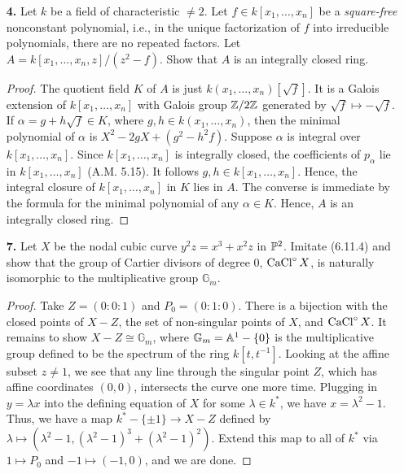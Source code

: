 \documentclass{article}
\begin{document}
\begin{enumerate} [label=\textbf{\arabic*.}, leftmargin=0em]
\item [\textbf{4.}] Let $k$ be a field of characteristic $\neq 2$. Let $f \in k[x_1, \dots, x_n]$ be a \textit{square-free} nonconstant polynomial, i.e., in the unique factorization of $f$ into irreducible polynomials, there are no repeated factors. Let $A = k[x_1, \dots, x_n, z] / (z^2 - f)$. Show that $A$ is an integrally closed ring.

\begin{proof}
    The quotient field $K$ of $A$ is just $k(x_1, \dots, x_n)[\sqrt{f}]$.
    It is a Galois extension of $k[x_1, \dots, x_n]$ with Galois group $\mathbb{Z} / 2 \mathbb{Z}$ generated by $\sqrt{f} \mapsto -\sqrt{f}$.
    If $\alpha = g + h \sqrt{f} \in K$, where $g, h \in k(x_1, \dots, x_n)$, then the minimal polynomial of $\alpha$ is $X^2 - 2g X + (g^2 - h^2f)$. Suppose $\alpha$ is integral over $k[x_1, \dots, x_n]$. Since $k[x_1, \dots, x_n]$ is integrally closed, the coefficients of $p_\alpha$ lie in $k[x_1, \dots, x_n]$ (A.M. 5.15). It follows $g, h \in k[x_1, \dots, x_n]$. Hence, the integral closure of $k[x_1, \dots, x_n]$ in $K$ lies in $A$. The converse is immediate by the formula for the minimal polynomial of any $\alpha \in K$. Hence, $A$ is an integrally closed ring.
\end{proof}

\item[\textbf{7.}] Let $X$ be the nodal cubic curve $y^2 z = x^3 + x^2 z$ in $\mathbb{P}^2$. Imitate (6.11.4) and show that the group of Cartier divisors of degree $0$, $\operatorname{CaCl}^\circ X$, is naturally isomorphic to the multiplicative group $\mathbb{G}_m$.

\begin{proof}
   Take $Z = (0:0:1)$ and $P_0 = (0:1:0)$.
   There is a bijection with the closed points of $X - Z$, the set of non-singular points of $X$, and $\operatorname{CaCl}^\circ X$.
   It remains to show $X - Z \cong \mathbb{G}_m$, where $\mathbb{G}_m = \mathbb{A}^1 - \{ 0 \}$ is the multiplicative group defined to be the spectrum of the ring $k[t, t^{-1}]$.
   Looking at the affine subset $z \neq 1$, we see that any line through the singular point $Z$, which has affine coordinates $(0, 0)$, intersects the curve one more time. 
   Plugging in $y = \lambda x$ into the defining equation of $X$ for some $\lambda \in k^*$, we have $x = \lambda^2  - 1$.
   Thus, we have a map $k^* - \{ \pm 1 \} \to X - Z$ defined by $\lambda \mapsto (\lambda^2 - 1, (\lambda^2 - 1)^3 + (\lambda^2 - 1)^2)$.
   Extend this map to all of $k^*$ via $1 \mapsto P_0$ and $-1 \mapsto (-1, 0)$, and we are done.
\end{proof}


\end{enumerate}
\end{document}
